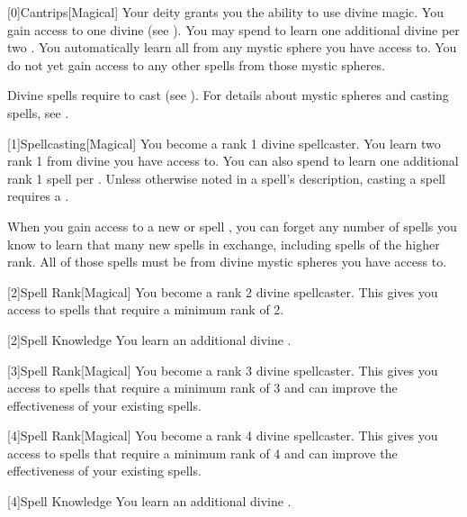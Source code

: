         [0]{Cantrips}[Magical]
        Your deity grants you the ability to use divine magic.
        You gain access to one divine  (see ).
        You may spend  to learn one additional divine  per two .
        You automatically learn all  from any mystic sphere you have access to.
        You do not yet gain access to any other spells from those mystic spheres.

        Divine spells require  to cast (see ).
        For details about mystic spheres and casting spells, see .

        [1]{Spellcasting}[Magical]
        You become a rank 1 divine spellcaster.
        You learn two rank 1  from divine  you have access to.
        You can also spend  to learn one additional rank 1 spell per .
        Unless otherwise noted in a spell's description, casting a spell requires a .

        When you gain access to a new  or spell ,
            you can forget any number of spells you know to learn that many new spells in exchange,
            including spells of the higher rank.
        All of those spells must be from divine mystic spheres you have access to.

        [2]{Spell Rank}[Magical] You become a rank 2 divine spellcaster.
        This gives you access to spells that require a minimum rank of 2.

        [2]{Spell Knowledge} You learn an additional divine .

        [3]{Spell Rank}[Magical] You become a rank 3 divine spellcaster.
        This gives you access to spells that require a minimum rank of 3 and can improve the effectiveness of your existing spells.

        [4]{Spell Rank}[Magical] You become a rank 4 divine spellcaster.
        This gives you access to spells that require a minimum rank of 4 and can improve the effectiveness of your existing spells.

        [4]{Spell Knowledge} You learn an additional divine .

